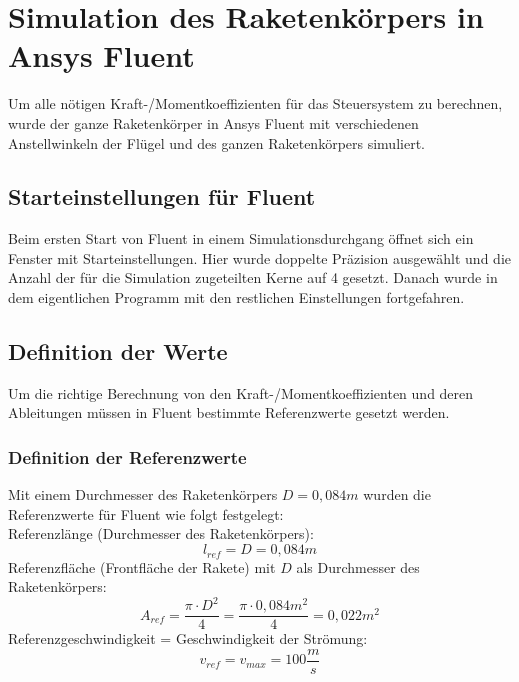 \section{Simulation des Raketenkörpers in Ansys Fluent}
\label{sec:used_software_sim}
Um alle nötigen Kraft-/Momentkoeffizienten für das Steuersystem zu berechnen, wurde der ganze Raketenkörper in Ansys Fluent mit verschiedenen Anstellwinkeln der Flügel und des ganzen Raketenkörpers simuliert.

\subsection{Starteinstellungen für Fluent}
\label{subsec:start_settings_fluent}
Beim ersten Start von Fluent in einem Simulationsdurchgang öffnet sich ein Fenster mit Starteinstellungen. Hier wurde doppelte Präzision ausgewählt und die Anzahl der für die Simulation zugeteilten Kerne auf 4 gesetzt. Danach wurde in dem eigentlichen Programm mit den restlichen Einstellungen fortgefahren.

\subsection{Definition der Werte}
\label{subsec:reference_sim_values}
Um die richtige Berechnung von den Kraft-/Momentkoeffizienten und deren Ableitungen müssen in Fluent bestimmte Referenzwerte gesetzt werden.

\subsubsection*{Definition der Referenzwerte}
\label{subsubsec:reference_values}
Mit einem Durchmesser des Raketenkörpers $D = 0,084m$ wurden die Referenzwerte für Fluent wie folgt festgelegt:
\\
Referenzlänge (Durchmesser des Raketenkörpers):
\begin{equation}
    l_{ref} = D = 0,084m
\end{equation}
Referenzfläche (Frontfläche der Rakete) mit $D$ als Durchmesser des Raketenkörpers:
\begin{equation}
    A_{ref} = \frac{\pi \cdot D^2}{4} = \frac{\pi \cdot 0,084m^2}{4} = 0,022m^2
\end{equation}
Referenzgeschwindigkeit = Geschwindigkeit der Strömung:
\begin{equation}
    v_{ref} = v_{max} = 100\frac{m}{s}
\end{equation}


